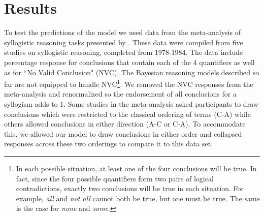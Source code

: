 \documentclass[10pt,letterpaper]{article}
\begin{document}


\section{Results}

To test the predictions of the model we used data from the meta-analysis of syllogistic reasoning tasks presented by . These data were compiled from five studies on syllogistic reasoning, completed from 1978-1984. The data include percentage response for conclusions that contain each of the 4 quantifiers as well as for ``No Valid Conclusion" (NVC). The Bayesian reasoning models described so far are not equipped to handle NVC\footnote{In each possible situation, at least one of the four conclusions will be true. In fact, since the four possible quantifiers form two pairs of logical contradictions, exactly two conclusions will be true in each situation.  For example, \emph{all} and \emph{not all} cannot both be true, but one must be true. The same is the case for \emph{none} and \emph{some}.}. We removed the NVC responses from the meta-analysis and renormalized so the endorsement of all conclusions for a syllogism adds to 1. Some studies in the meta-analysis asked participants to draw conclusions which were restricted to the classical ordering of terms (C-A) while others allowed conclusions in either direction (A-C or C-A). To accommodate this, we allowed our model to draw conclusions in either order and collapsed responses across these two orderings to compare it to this data set.
\end{document}

